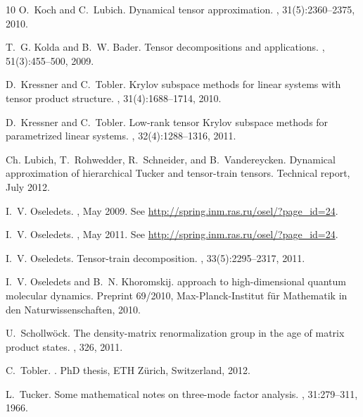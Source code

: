 \documentclass[11pt, a4paper]{article}
\begin{document}
\begin{thebibliography}{10}
O.~Koch and C.~Lubich.
\newblock Dynamical tensor approximation.
, 31(5):2360--2375, 2010.

T.~G. Kolda and B.~W. Bader.
\newblock Tensor decompositions and applications.
, 51(3):455--500, 2009.

D.~Kressner and C.~Tobler.
\newblock Krylov subspace methods for linear systems with tensor product
  structure.
, 31(4):1688--1714, 2010.

D.~Kressner and C.~Tobler.
\newblock Low-rank tensor {K}rylov subspace methods for parametrized linear
  systems.
, 32(4):1288--1316, 2011.

Ch. Lubich, T.~Rohwedder, R.~Schneider, and B.~Vandereycken.
\newblock Dynamical approximation of hierarchical {T}ucker and tensor-train
  tensors.
\newblock Technical report, July 2012.

I.~V. Oseledets.
, May 2009.
\newblock See \url{http://spring.inm.ras.ru/osel/?page_id=24}.

I.~V. Oseledets.
, May 2011.
\newblock See \url{http://spring.inm.ras.ru/osel/?page_id=24}.

I.~V. Oseledets.
\newblock Tensor-train decomposition.
, 33(5):2295--2317, 2011.

I.~V. Oseledets and B.~N. Khoromskij.
 approach to high-dimensional quantum molecular dynamics.
\newblock Preprint 69/2010, Max-Planck-Institut f\"ur Mathematik in den
  Naturwissenschaften, 2010.

U.~Schollw\"ock.
\newblock The density-matrix renormalization group in the age of matrix product
  states.
, 326, 2011.

C.~Tobler.
.
\newblock PhD thesis, ETH Z{\"u}rich, Switzerland, 2012.

L.~Tucker.
\newblock Some mathematical notes on three-mode factor analysis.
, 31:279--311, 1966.

\end{thebibliography}
\end{document}
